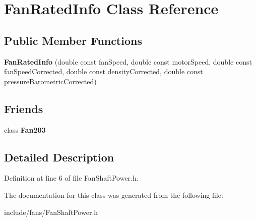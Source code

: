 \hypertarget{class_fan_rated_info}{}\section{Fan\+Rated\+Info Class Reference}
\label{class_fan_rated_info}
\subsection*{Public Member Functions}
\begin{DoxyCompactItemize}
\item 
\mbox{\label{class_fan_rated_info_aa76c95537bd1a0cd0159a8d45df76f18}} 
{\bfseries Fan\+Rated\+Info} (double const fan\+Speed, double const motor\+Speed, double const fan\+Speed\+Corrected, double const density\+Corrected, double const pressure\+Barometric\+Corrected)
\end{DoxyCompactItemize}
\subsection*{Friends}
\begin{DoxyCompactItemize}
\item 
\mbox{\label{class_fan_rated_info_ace899f7afbdc2350f3651b93b809f2fd}} 
class {\bfseries Fan203}
\end{DoxyCompactItemize}


\subsection{Detailed Description}


Definition at line 6 of file Fan\+Shaft\+Power.\+h.



The documentation for this class was generated from the following file\+:\begin{DoxyCompactItemize}
\item 
include/fans/Fan\+Shaft\+Power.\+h\end{DoxyCompactItemize}
